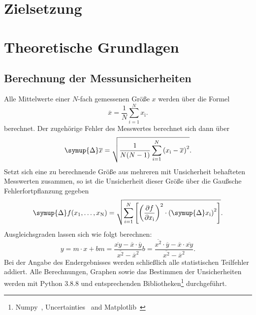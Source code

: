 \section{Zielsetzung}\label{sec:ziel}

\section{Theoretische Grundlagen}\label{sec:Theorie}
\subsection{Berechnung der Messunsicherheiten}\label{ssec:Fehlerrechnung}
Alle Mittelwerte einer $N$-fach gemessenen Größe $x$ werden über die Formel
\begin{equation}
    \overline{x} = \frac{1}{N} \sum_{i=1}^{N} x_\text{i} .
    \label{eqn:mittel}
\end{equation}
berechnet. Der zugehörige Fehler des Messwertes berechnet sich dann über
\begin{equation}
    \symup{\Delta} \overline{x} = \sqrt{\frac{1}{N(N-1)} \sum_{i=1}^{N} {(x_\text{i}-\overline{x})}^2} .
    \label{eqn:std}
\end{equation}
Setzt sich eine zu berechnende Größe aus mehreren mit Unsicherheit behafteten Messwerten zusammen, so ist die Unsicherheit dieser Größe über die Gaußsche Fehlerfortpflanzung gegeben
\begin{equation}
    \symup{\Delta} f(x_1, \ldots, x_\text{N}) = \sqrt{\sum_{i=1}^{N} \left[ {\left(\frac{\partial f}{\partial x_\text{i}}\right)}^2 \cdot {(\symup{\Delta} x_\text{i})}^2 \right] } .
    \label{eqn:gaus}
\end{equation}
Ausgleichsgraden lassen sich wie folgt berechnen:
\begin{subequations}
    \begin{equation}
        y = m \cdot x + b
        \label{eqn:grade}
    \end{equation}
    \begin{equation}
        m = \frac{\overline{xy} - \overline{x} \cdot \overline{y}}{\overline{x^2} - \overline{x}^2}
        \label{eqn:steigung}
    \end{equation}
    \begin{equation}
        b = \frac{\overline{x^2} \cdot \overline{y} - \overline{x} \cdot \overline{xy}}{\overline{x^2} - \overline{x}^2} .
        \label{eqn:achsenab}
    \end{equation}
\end{subequations}
Bei der Angabe des Endergebnisses werden schließlich alle statistischen Teilfehler addiert.
Alle Berechnungen, Graphen sowie das Bestimmen der Unsicherheiten werden mit Python 3.8.8 und entsprechenden Bibliotheken\footnote{Numpy~\cite{numpy}, Uncertainties~\cite{uncertainties} and Matplotlib~\cite{matplotlib}} durchgeführt.

